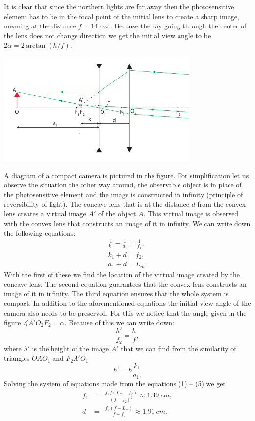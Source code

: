 \solueng
It is clear that since the northern lights are far away then the photosensitive element has to be in the focal point of the initial lens to create a sharp image, meaning at the distance $f=\SI{14}{cm}.$. Because the ray going through the center of the lens does not change direction we get the initial view angle to be $2\alpha=2\arctan\left(h/f\right)$.
\begin{center}
	\includegraphics[width=10cm]{2017-v3g-08-skeem__telephoto}
\end{center}
A diagram of a compact camera is pictured in the figure. For simplification let us observe the situation the other way around, the observable object is in place of the photosensitive element and the image is constructed in infinity (principle of reversibility of light). The concave lens that is at the distance $d$ from the convex lens creates a virtual image $A'$ of the object $A$. This virtual image is observed with the convex lens that constructs an image of it in infinity. We can write down the following equations:
\begin{eqnarray}
\frac{1}{k_{1}}-\frac{1}{a_{1}} = \frac{1}{f_{1}}, \label{2017-v3g-08-eq:telelens-eq1}\\
k_{1}+d = f_{2},\\
a_{1}+d = L_{m}.
\end{eqnarray}
With the first of these we find the location of the virtual image created by the concave lens. The second equation guarantees that the convex lens constructs an image of it in infinity. The third equation ensures that the whole system is compact. In addition to the aforementioned equations the initial view angle of the camera also needs to be preserved. For this we notice that the angle given in the figure $\measuredangle A'O_{2}F_{2}=\alpha$. Because of this we can write down:
\begin{equation}
\frac{h'}{f_{2}}=\frac{h}{f},
\end{equation}
where $h'$ is the height of the image $A'$ that we can find from the similarity of triangles $OAO_{1}$ and $F_{2}A'O_{1}$
\begin{equation}
h'=h\frac{k_{1}}{a_{1}.}\label{2017-v3g-08-eq:telelens-eq2}
\end{equation}
Solving the system of equations made from the equations (1) – (5) we get
\begin{eqnarray*}
f_{1} & = & \frac{f_{2}f(L_{m}-f_{2})}{\left(f-f_{2}\right)^{2}}\approx\SI{1.39}{cm},\\
d & = & \frac{f_{2}(f-L_{m})}{f-f_{2}}\approx\SI{1.91}{cm}.
\end{eqnarray*}
\probend